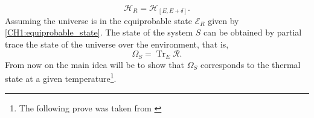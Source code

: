 \begin{equation}
\mathcal{H}_{R}=\mathcal{H}_{[E, E+\delta]}.
\end{equation}
\indent Assuming the universe is in the equiprobable state $\mathcal{E}_R$ given by \eqref{CH1:equiprobable_state}.  The state of the system $S$ can be obtained by partial trace the state of the universe over the environment, that is,
\begin{equation}
\Omega_S = \operatorname{Tr}_{E}\mathcal{R}.
\label{CH1:Canonical_state}
\end{equation}
\indent From now on the main idea will be to show that $\Omega_S$ corresponds to the  thermal state at a given temperature\footnote{The following prove was taken from \cite{huang_statistical_1987}}.\\

